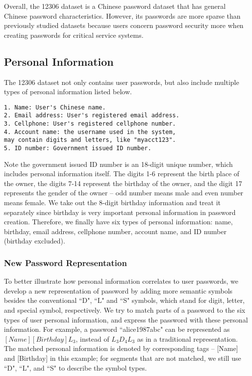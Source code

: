 Overall, the 12306 dataset is a Chinese password dataset that has
general Chinese password characteristics. However, its passwords are
more sparse than previously studied datasets because users concern
password security more when creating passwords for critical service
systems.

\subsection{Personal Information}
The 12306 dataset not only contains user passwords, but also include
multiple types of personal information listed below.

\begin{verbatim}
1. Name: User's Chinese name.
2. Email address: User's registered email address.
3. Cellphone: User's registered cellphone number.
4. Account name: the username used in the system, 
may contain digits and letters, like "myacct123".
5. ID number: Government issued ID number.
\end{verbatim}

Note the government issued ID number is an 18-digit unique number,
which includes personal information itself. The digits 1-6 represent
the birth place of the owner, the digits 7-14 represent the birthday
of the owner, and the digit 17 represents the gender of the owner --
odd number means male and even number means female. We take out the
8-digit birthday information and treat it separately since birthday is
very important personal information in password creation. Therefore,
we finally have six types of personal information: name, birthday,
email address, cellphone number, account name, and ID number (birthday
excluded).

\subsubsection{New Password Representation}
To better illustrate how personal information correlates to user
passwords, we develop a new representation of password by adding more
semantic symbols besides the conventional ``D", ``L" and ``S" symbols,
which stand for digit, letter, and special symbol, respectively. We
try to match parts of a password to the six types of user personal
information, and express the password with these personal
information. For example, a password ``alice1987abc" can be
represented as $[Name][Birthday]L_3$, instead of $L_3D_4L_3$ as in a
traditional representation. The matched personal information is
denoted by corresponding tags -- [Name] and [Birthday] in this
example; for segments that are not matched, we still use ``D",
``L", and ``S" to describe the symbol types. 

